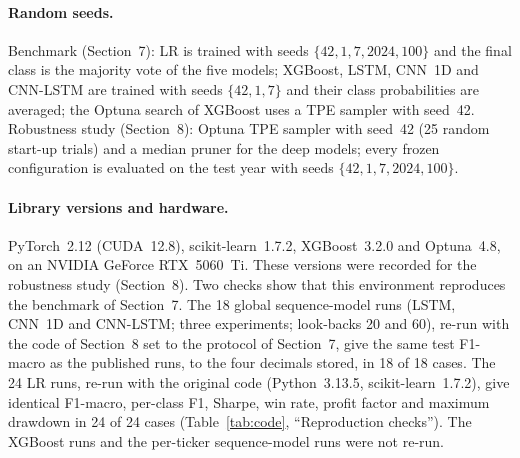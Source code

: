 \documentclass[10pt]{article}
\begin{document}
\paragraph{Random seeds.} Benchmark (Section~7): LR is trained with seeds $\{42, 1, 7, 2024, 100\}$ and
the final class is the majority vote of the five models; XGBoost, LSTM, CNN~1D and CNN-LSTM are
trained with seeds $\{42, 1, 7\}$ and their class probabilities are averaged; the Optuna search of
XGBoost uses a TPE sampler with seed~42. Robustness study (Section~8): Optuna TPE sampler with seed~42
(25 random start-up trials) and a median pruner for the deep models; every frozen configuration is
evaluated on the test year with seeds $\{42, 1, 7, 2024, 100\}$.

\paragraph{Library versions and hardware.} PyTorch~2.12 (CUDA~12.8), scikit-learn~1.7.2,
XGBoost~3.2.0 and Optuna~4.8, on an NVIDIA GeForce RTX~5060~Ti. These versions were recorded for
the robustness study (Section~8). Two checks show that this environment reproduces the benchmark of
Section~7. The 18 global sequence-model runs (LSTM, CNN~1D and CNN-LSTM; three experiments;
look-backs 20 and 60), re-run with the code of Section~8 set to the protocol of Section~7, give the
same test F1-macro as the published runs, to the four decimals stored, in 18 of 18 cases. The 24 LR
runs, re-run with the original code (Python~3.13.5, scikit-learn~1.7.2), give identical F1-macro,
per-class F1, Sharpe, win rate, profit factor and maximum drawdown in 24 of 24 cases
(Table~\ref{tab:code}, ``Reproduction checks''). The XGBoost runs and the per-ticker
sequence-model runs were not re-run.
\end{document}
